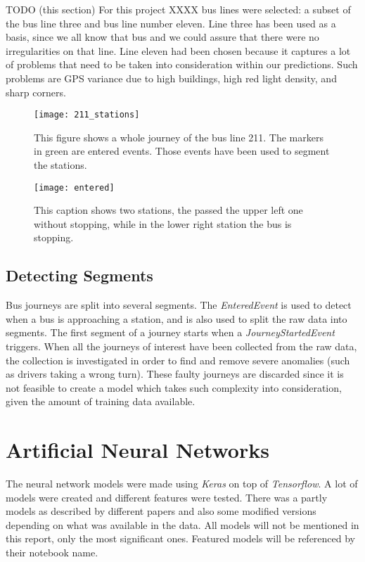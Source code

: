 TODO (this section) For this project XXXX bus lines were selected: a subset of the bus line three and bus line number eleven. Line three has been used as a basis, since we all know that bus and we could assure that there were no irregularities on that line. Line eleven had been chosen because it captures a lot of problems that need to be taken into consideration within our predictions. Such problems are GPS variance due to high buildings, high red light density, and sharp corners. 

\begin{figure}[t!]
\begin{minipage}{.5\textwidth}
	\texttt{[image: 211\_stations]}
	\caption{This figure shows a whole journey of the bus line 211. The markers in green are entered events. Those events have been used to segment the stations.}
	\label{fig:211_stations}
\end{minipage}%
\hspace{5pt}
\begin{minipage}{.48\textwidth}
\texttt{[image: entered]}
\caption{This caption shows two stations,  the passed the upper left one without stopping, while in the lower right station the bus is stopping.}
\label{fig:entered}
\end{minipage}
\end{figure}


\subsection{Detecting Segments}
Bus journeys are split into several segments. The \textit{EnteredEvent} is used to detect when a bus is approaching a station, and is also used to split the raw data into segments. The first segment of a journey starts when a \textit{JourneyStartedEvent} triggers. When all the journeys of interest have been collected from the raw data, the collection is investigated in order to find and remove severe anomalies (such as drivers taking a wrong turn). These faulty journeys are discarded since it is not feasible to create a model which takes such complexity into consideration, given the amount of training data available.

\section{Artificial Neural Networks}
The neural network models were made using \textit{Keras} on top of \textit{Tensorflow}. A lot of models were created and different features were tested. There was a partly models as described by different papers and also some modified versions depending on what was available in the data.
All models will not be mentioned in this report, only the most significant ones. Featured models will be referenced by their notebook name.

